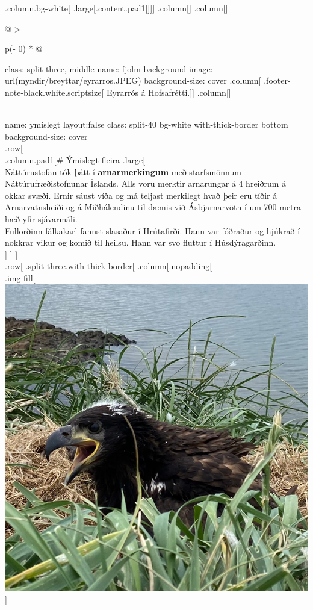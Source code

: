 \documentclass[
]{article}
\begin{document}
.column.bg-white{[} .large{[}.content.pad1{[}{]}{]}{]} .column{[}{]}
.column{[}{]}

\begin{longtable}[]{@{}
  >{\raggedright\arraybackslash}p{(\columnwidth - 0\tabcolsep) * }@{}}
\toprule
\begin{minipage}[b]{\linewidth}\raggedright
class: split-three, middle name: fjolm background-image:
url(myndir/breyttar/eyrarros.JPEG) background-size: cover .column{[}
.footer-note-black.white.scriptsize{[} Eyrarrós á Hofsafrétti.{]}{]}
.column{[}{]}
\end{minipage} \\
\midrule
\endhead
name: ymislegt layout:false class: split-40 bg-white with-thick-border
bottom background-size: cover \\
.row{[} \\
.column.pad1{[}\# Ýmislegt fleira .large{[} \\
Náttúrustofan tók þátt í \textbf{arnarmerkingum} með starfsmönnum
Náttúrufræðistofnunar Íslands. Alls voru merktir arnarungar á 4 hreiðrum
á okkar svæði. Ernir sáust víða og má teljast merkilegt hvað þeir eru
tíðir á Arnarvatnsheiði og á Miðhálendinu til dæmis við Ásbjarnarvötn í
um 700 metra hæð yfir sjávarmáli. \\
Fullorðinn fálkakarl fannst slasaður í Hrútafirði. Hann var fóðraður og
hjúkrað í nokkrar vikur og komið til heilsu. Hann var svo fluttur í
Húsdýragarðinn. \\
{]} {]} {]} \\
.row{[} .split-three.with-thick-border{[} .column{[}.nopadding{[} \\
.img-fill{[}\includegraphics{myndir/breyttar/arnarungi.JPEG}{]}

\end{longtable}
\end{document}
